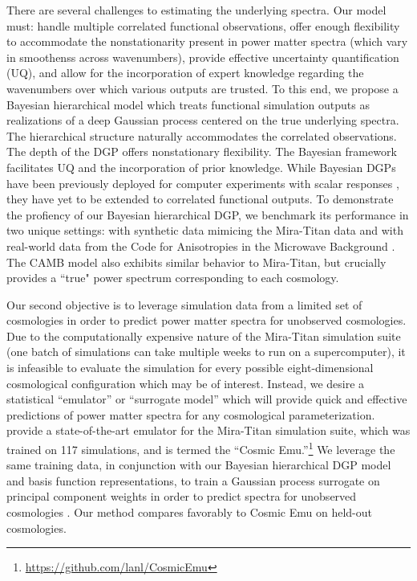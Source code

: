 \documentclass[11pt]{article}
\begin{document}
There are several challenges to estimating the underlying spectra.  Our model
must: handle multiple correlated functional observations, offer enough 
flexibility to accommodate the nonstationarity present in power matter spectra 
(which vary in smoothenss across wavenumbers), provide effective uncertainty
quantification (UQ), and allow for the incorporation of expert knowledge 
regarding the wavenumbers over which various outputs are trusted.  To this end, 
we propose a Bayesian hierarchical model which treats functional simulation 
outputs as realizations of a deep Gaussian process \citep[DGP;][]{damianou2013deep} 
centered on the true underlying spectra.  The hierarchical structure naturally
accommodates the correlated observations.  The depth of the DGP offers nonstationary
flexibility.  The Bayesian framework facilitates UQ and the incorporation of prior
knowledge.  While Bayesian DGPs have been previously deployed for computer experiments 
with scalar responses \citep[e.g.,][]{sauer2023active,sauer2023vecchia,ming2023deep}, 
they have yet to be extended to correlated functional outputs. 
To demonstrate the profiency of our Bayesian hierarchical DGP, 
we benchmark its performance in two unique settings: with synthetic data 
mimicing the Mira-Titan data and with real-world data from 
the Code for Anisotropies in the Microwave Background \citep[CAMB;][]{lewis2011CAMB}.
The CAMB model also exhibits similar behavior to Mira-Titan, but crucially
provides a ``true" power spectrum corresponding to each cosmology.

Our second objective is to leverage simulation data from a limited set of
cosmologies in order to predict power matter spectra for unobserved cosmologies.
Due to the computationally expensive nature of the Mira-Titan simulation suite
(one batch of simulations can take multiple weeks to run on a supercomputer),
it is infeasible to evaluate the simulation for every possible eight-dimensional
cosmological configuration which may be of interest.  Instead, we desire
a statistical ``emulator'' or ``surrogate model'' 
\citep{santner2003design,gramacy2020surrogates} which will provide quick and effective
predictions of power matter spectra for any cosmological parameterization.
\citet{moran2023mira} provide a state-of-the-art emulator for the Mira-Titan
simulation suite, which was trained on 117 simulations, and is termed 
the ``Cosmic Emu.''\footnote{\url{https://github.com/lanl/CosmicEmu}}
We leverage the same training data, in conjunction with our Bayesian hierarchical
DGP model and basis function representations, to train a Gaussian process surrogate 
on principal component weights in order to predict spectra for unobserved
cosmologies \citep{higdon2008computer, higdon2010estcosmo}. 
Our method compares favorably to Cosmic Emu on held-out cosmologies.
\end{document}
